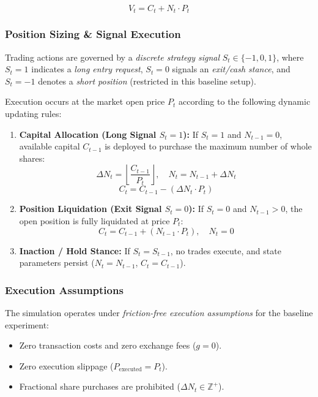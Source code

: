 \documentclass{article}
\begin{document}
\[
V_t = C_t + N_t \cdot P_t
\]

\subsubsection{Position Sizing \& Signal Execution}
Trading actions are governed by a \textit{discrete strategy signal} $S_t \in \{-1, 0, 1\}$, where $S_t = 1$ indicates a \textit{long entry request}, $S_t = 0$ signals an \textit{exit/cash stance}, and $S_t = -1$ denotes a \textit{short position} (restricted in this baseline setup).

Execution occurs at the market open price $P_t$ according to the following dynamic updating rules:

\begin{enumerate}
    \item \textbf{Capital Allocation (Long Signal $S_t = 1$):} If $S_t = 1$ and $N_{t-1} = 0$, available capital $C_{t-1}$ is deployed to purchase the maximum number of whole shares:
    \[
    \Delta N_t = \left\lfloor \frac{C_{t-1}}{P_t} \right\rfloor, \quad N_t = N_{t-1} + \Delta N_t
    \]
    \[
    C_t = C_{t-1} - (\Delta N_t \cdot P_t)
    \]

    \item \textbf{Position Liquidation (Exit Signal $S_t = 0$):} If $S_t = 0$ and $N_{t-1} > 0$, the open position is fully liquidated at price $P_t$:
    \[
    C_t = C_{t-1} + (N_{t-1} \cdot P_t), \quad N_t = 0
    \]

    \item \textbf{Inaction / Hold Stance:} If $S_t = S_{t-1}$, no trades execute, and state parameters persist ($N_t = N_{t-1}$, $C_t = C_{t-1}$).
\end{enumerate}

\subsubsection{Execution Assumptions}
The simulation operates under \textit{friction-free execution assumptions} for the baseline experiment:
\begin{itemize}
    \item Zero transaction costs and zero exchange fees ($g = 0$).
    \item Zero execution slippage ($P_{\text{executed}} = P_t$).
    \item Fractional share purchases are prohibited ($\Delta N_t \in \mathbb{Z}^+$).
\end{itemize}
\end{document}
